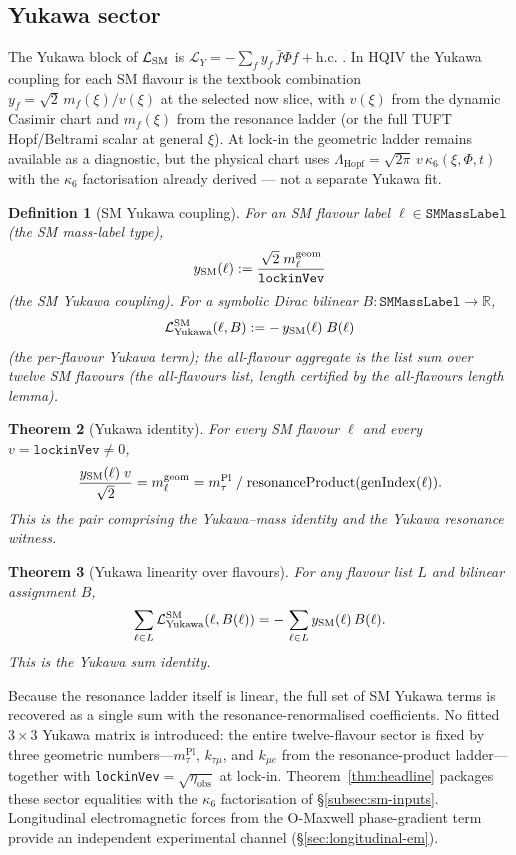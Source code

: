 \documentclass[11pt]{amsart}
\newtheorem{theorem}{Theorem}[section]
\newtheorem{definition}[theorem]{Definition}
\begin{document}
\subsection{Yukawa sector}

The Yukawa block of $\mathcal{L}_{\rm SM}$ is $\mathcal{L}_Y=-\sum_f y_f\,\bar f\Phi f + \text{h.c.}$ \cite{yukawa1935,peskin1995}. In HQIV the Yukawa coupling for each SM flavour is the textbook combination $y_f=\sqrt{2}\, m_f(\xi)/v(\xi)$ at the selected now slice, with $v(\xi)$ from the dynamic Casimir chart and $m_f(\xi)$ from the resonance ladder (or the full TUFT Hopf/Beltrami scalar at general $\xi$). At lock-in the geometric ladder remains available as a diagnostic, but the physical chart uses $\Lambda_{\mathrm{Hopf}}=\sqrt{2\pi}\,v\,\kappa_6(\xi,\Phi,t)$ with the $\kappa_6$ factorisation already derived — not a separate Yukawa fit.

\begin{definition}[SM Yukawa coupling]
For an SM flavour label $\ell\in\texttt{SMMassLabel}$ (the SM mass-label type),
\[
y_{\rm SM}(\ell)
:= \frac{\sqrt{2}\;m_\ell^{\mathrm{geom}}}{\texttt{lockinVev}}
\]
(the SM Yukawa coupling). For a symbolic Dirac bilinear $B:\texttt{SMMassLabel}\to\mathbb{R}$,
\[
\mathcal{L}^{\rm SM}_{\rm Yukawa}(\ell, B)
:= -\,y_{\rm SM}(\ell)\;B(\ell)
\]
(the per-flavour Yukawa term); the all-flavour aggregate is the list sum over twelve SM flavours (the all-flavours list, length certified by the all-flavours length lemma).
\end{definition}

\begin{theorem}[Yukawa identity]
For every SM flavour $\ell$ and every $v=\texttt{lockinVev}\neq 0$,
\[
\frac{y_{\rm SM}(\ell)\;v}{\sqrt{2}} = m_\ell^{\mathrm{geom}}
= m_\tau^{\rm Pl}\;/\;\mathrm{resonanceProduct}(\mathrm{genIndex}(\ell)).
\]
This is the pair comprising the Yukawa–mass identity and the Yukawa resonance witness.
\end{theorem}

\begin{theorem}[Yukawa linearity over flavours]
For any flavour list $L$ and bilinear assignment $B$,
\[
\sum_{\ell\in L} \mathcal{L}^{\rm SM}_{\rm Yukawa}(\ell, B(\ell))
= -\,\sum_{\ell\in L} y_{\rm SM}(\ell)\,B(\ell) .
\]
This is the Yukawa sum identity.
\end{theorem}

Because the resonance ladder itself is linear, the full set of SM Yukawa terms is recovered as a single sum with the resonance-renormalised coefficients. No fitted $3\times 3$ Yukawa matrix is introduced: the entire twelve-flavour sector is fixed by three geometric numbers---$m_\tau^{\mathrm{Pl}}$, $k_{\tau\mu}$, and $k_{\mu e}$ from the resonance-product ladder---together with \texttt{lockinVev}$=\sqrt{\eta_{\mathrm{obs}}}$ at lock-in. Theorem~\ref{thm:headline} packages these sector equalities with the $\kappa_6$ factorisation of §\ref{subsec:sm-inputs}. Longitudinal electromagnetic forces from the O-Maxwell phase-gradient term provide an independent experimental channel (\S\ref{sec:longitudinal-em}).
\end{document}
